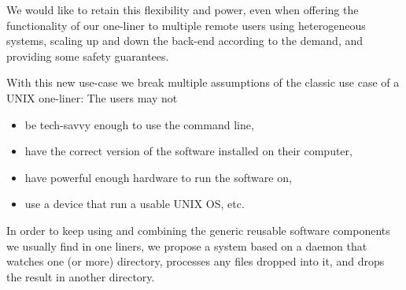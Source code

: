 \documentclass[letterpaper,twocolumn,10pt]{article}
\begin{document}
We would like to retain this flexibility and power, even when offering the functionality of our one-liner to multiple remote users using heterogeneous systems, scaling up and down the back-end according to the demand, and providing some safety guarantees.

With this new use-case we break multiple assumptions of the classic use case of a UNIX one-liner: The users may not
\begin{itemize}
\item be tech-savvy enough to use the command line,
\item have the correct version of the software installed on their computer,
\item have powerful enough hardware to run the software on,
\item use a device that run a usable UNIX OS, etc.
\end{itemize}

In order to keep using and combining the generic reusable software components we usually find in one liners, we propose a system based on a daemon that watches one (or more) directory, processes any files dropped into it, and drops the result in another directory.
\end{document}
